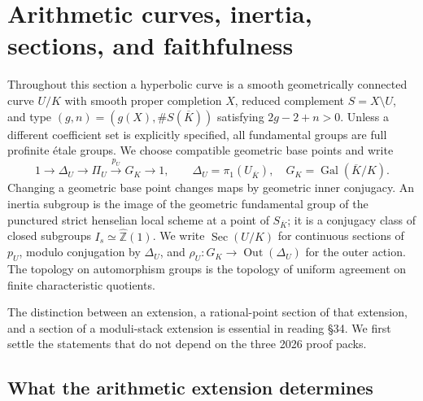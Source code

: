 \section{Arithmetic curves, inertia, sections, and faithfulness}
\label{sec:D}

Throughout this section a hyperbolic curve is a smooth geometrically connected
curve $U/K$ with smooth proper completion $X$, reduced complement $S=X\setminus U$,
and type $(g,n)=(g(X),\#S(\overline K))$ satisfying $2g-2+n>0$.
Unless a different coefficient set is explicitly specified, all fundamental groups
are full profinite \'etale groups.  We choose compatible geometric base points and
write
\[
 1\longrightarrow\Delta_U\longrightarrow\Pi_U
   \xrightarrow{p_U}G_K\longrightarrow1,
 \qquad \Delta_U=\pi_1(U_{\overline K}),\quad G_K=\operatorname{Gal}(\overline K/K).
\]
Changing a geometric base point changes maps by geometric inner conjugacy.
An inertia subgroup is the image of the geometric fundamental group of the
punctured strict henselian local scheme at a point of $S_{\overline K}$;
it is a conjugacy class of closed subgroups $I_s\simeq\widehat{\mathbb Z}(1)$.
We write $\operatorname{Sec}(U/K)$ for continuous sections of $p_U$, modulo
conjugation by $\Delta_U$, and $\rho_U:G_K\to\operatorname{Out}(\Delta_U)$ for
the outer action.  The topology on automorphism groups is the topology of
uniform agreement on finite characteristic quotients.

The distinction between an extension, a rational-point section of that extension,
and a section of a moduli-stack extension is essential in reading \S34.
We first settle the statements that do not depend on the three 2026 proof packs.

\subsection{What the arithmetic extension determines}

